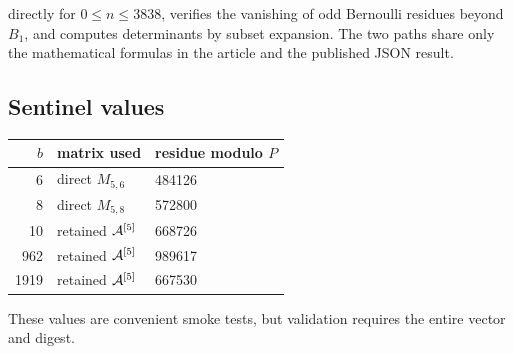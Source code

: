 directly for $0\le n\le3838$, verifies the vanishing of odd Bernoulli
residues beyond $B_1$, and computes determinants by subset expansion.
The two paths share only the mathematical formulas in the article and
the published JSON result.

\subsection{Sentinel values}

\begin{center}
\begin{tabular}{rll}
\toprule
$b$&matrix used&residue modulo $P$\\
\midrule
6&direct $M_{5,6}$&484126\\
8&direct $M_{5,8}$&572800\\
10&retained $\mathcal{A}^{[5]}$&668726\\
962&retained $\mathcal{A}^{[5]}$&989617\\
1919&retained $\mathcal{A}^{[5]}$&667530\\
\bottomrule
\end{tabular}
\end{center}

These values are convenient smoke tests, but validation requires the
entire vector and digest.
